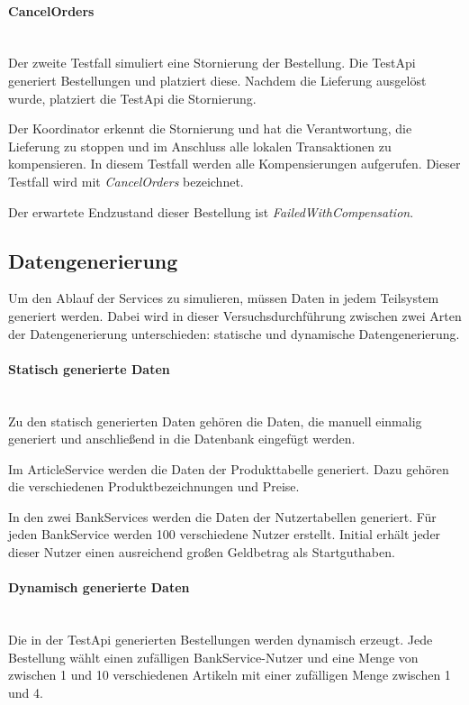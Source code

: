 \paragraph*{CancelOrders} \mbox{}\\
Der zweite Testfall simuliert eine Stornierung der Bestellung. Die TestApi generiert Bestellungen und platziert diese. Nachdem die Lieferung ausgelöst wurde, platziert die TestApi die Stornierung. 

Der Koordinator erkennt die Stornierung und hat die Verantwortung, die Lieferung zu stoppen und im Anschluss alle lokalen Transaktionen zu kompensieren. In diesem Testfall werden alle Kompensierungen aufgerufen. Dieser Testfall wird mit \textit{CancelOrders} bezeichnet. 

Der erwartete Endzustand dieser Bestellung ist \textit{FailedWithCompensation}.
\subsection{Datengenerierung}
Um den Ablauf der Services zu simulieren, müssen Daten in jedem Teilsystem generiert werden. Dabei wird in dieser Versuchsdurchführung zwischen zwei Arten der Datengenerierung unterschieden: statische und dynamische Datengenerierung.

\paragraph*{Statisch generierte Daten} \mbox{}\\
Zu den statisch generierten Daten gehören die Daten, die manuell einmalig generiert und anschließend in die Datenbank eingefügt werden.

Im ArticleService werden die Daten der Produkttabelle generiert. Dazu gehören die verschiedenen Produktbezeichnungen und Preise.

In den zwei BankServices werden die Daten der Nutzertabellen generiert. Für jeden BankService werden 100 verschiedene Nutzer erstellt. Initial erhält jeder dieser Nutzer einen ausreichend großen Geldbetrag als Startguthaben. 

\paragraph*{Dynamisch generierte Daten} \mbox{}\\
Die in der TestApi generierten Bestellungen werden dynamisch erzeugt. Jede Bestellung wählt einen zufälligen BankService-Nutzer und eine Menge von zwischen 1 und 10 verschiedenen Artikeln mit einer zufälligen Menge zwischen 1 und 4.

